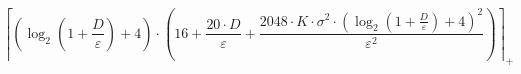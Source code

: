 \[\left\lceil \left(\log_{2}\left(1 + \frac{D}{\varepsilon}\right) + 4\right) \cdot \left(16 + \frac{20 \cdot D}{\varepsilon} + \frac{2048 \cdot K \cdot \sigma^{2} \cdot \left(\log_{2}\left(1 + \frac{D}{\varepsilon}\right) + 4\right)^{2}}{\varepsilon^{2}}\right) \right\rceil_{+}\]
